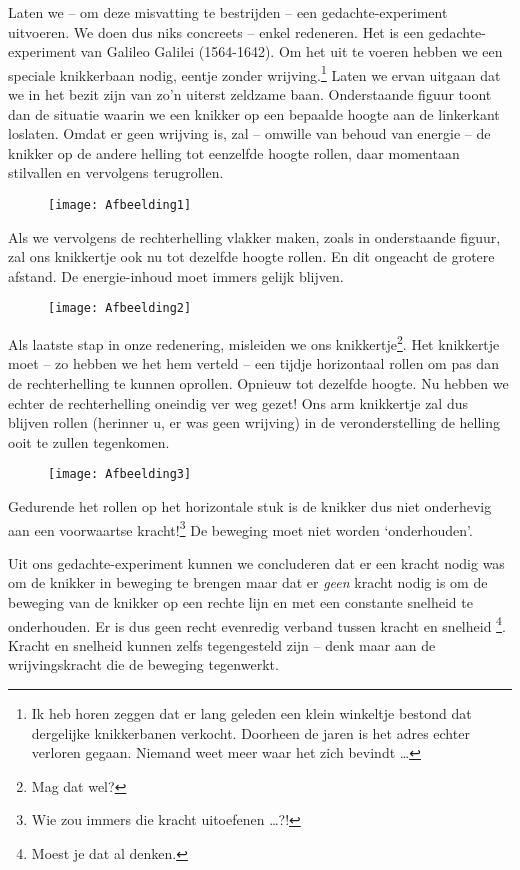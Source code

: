 \documentclass{ximera}
\begin{document}
	Laten we -- om deze misvatting te bestrijden -- een gedachte-experiment uitvoeren. We doen dus niks concreets -- enkel redeneren. Het is een gedachte-experiment van Galileo Galilei (1564-1642). Om het uit te voeren hebben we een speciale knikkerbaan nodig, eentje zonder wrijving.\footnote{Ik heb horen zeggen dat er lang geleden een klein winkeltje bestond dat dergelijke knikkerbanen verkocht. Doorheen de jaren is het adres echter verloren gegaan. Niemand weet meer waar het zich bevindt \ldots} Laten we ervan uitgaan dat we in het bezit zijn van zo'n uiterst zeldzame baan. Onderstaande figuur toont dan de situatie waarin we een knikker op een bepaalde hoogte aan de linkerkant loslaten. Omdat er geen wrijving is, zal -- omwille van behoud van energie -- de knikker op de andere helling tot eenzelfde hoogte rollen, daar momentaan stilvallen en vervolgens terugrollen.
	\begin{figure}[h]
	\centering
	\texttt{[image: Afbeelding1]}
	\label{Afbeelding1}
	\end{figure}
	
	Als we vervolgens de rechterhelling vlakker maken, zoals in onderstaande figuur, zal ons knikkertje ook nu tot dezelfde hoogte rollen. En dit ongeacht de grotere afstand. De energie-inhoud moet immers gelijk blijven.
	\begin{figure}[h]
	\centering
	\texttt{[image: Afbeelding2]}
	\end{figure}
	
	Als laatste stap in onze redenering, misleiden we ons knikkertje\footnote{Mag dat wel?}. Het knikkertje moet -- zo hebben we het hem verteld -- een tijdje horizontaal rollen om pas dan de rechterhelling te kunnen oprollen. Opnieuw tot dezelfde hoogte. Nu hebben we echter de rechterhelling oneindig ver weg gezet! Ons arm knikkertje zal dus blijven rollen (herinner u, er was geen wrijving) in de veronderstelling de helling ooit te zullen tegenkomen. 
	\begin{figure}[h]
	\centering
	\texttt{[image: Afbeelding3]}
	\end{figure}
	Gedurende het rollen op het horizontale stuk is de knikker dus niet onderhevig aan een voorwaartse kracht!\footnote{Wie zou immers die kracht uitoefenen \ldots?!} De beweging moet niet worden `onderhouden'. 
	
	Uit ons gedachte-experiment kunnen we concluderen dat er een kracht nodig was om de knikker in beweging te brengen maar dat er \emph{geen} kracht nodig is om de beweging van de knikker op een rechte lijn en met een constante snelheid te onderhouden. Er is dus geen recht evenredig verband tussen kracht en snelheid \footnote{Moest je dat al denken.}. Kracht en snelheid kunnen zelfs tegengesteld zijn -- denk maar aan de wrijvingskracht die de beweging tegenwerkt.
	
\end{document}
